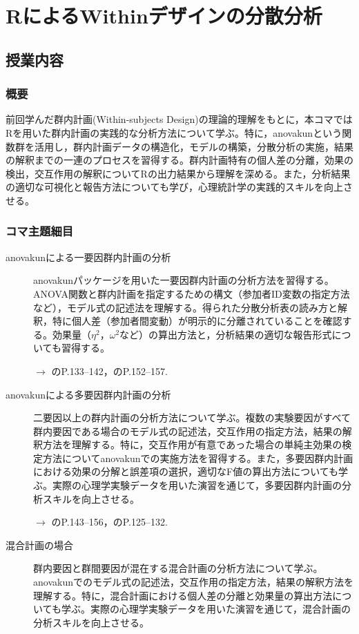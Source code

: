 \section{RによるWithinデザインの分散分析}
\label{b21_WithinDesign_onR}

\subsection{授業内容}
\subsubsection{概要}
前回学んだ群内計画(Within-subjects Design)の理論的理解をもとに，本コマではRを用いた群内計画の実践的な分析方法について学ぶ。特に，anovakunという関数群を活用し，群内計画データの構造化，モデルの構築，分散分析の実施，結果の解釈までの一連のプロセスを習得する。群内計画特有の個人差の分離，効果の検出，交互作用の解釈についてRの出力結果から理解を深める。また，分析結果の適切な可視化と報告方法についても学び，心理統計学の実践的スキルを向上させる。

\subsubsection{コマ主題細目}
\begin{description}

	\item[anovakunによる一要因群内計画の分析] anovakunパッケージを用いた一要因群内計画の分析方法を習得する。ANOVA関数と群内計画を指定するための構文（参加者ID変数の指定方法など），モデル式の記述法を理解する。得られた分散分析表の読み方と解釈，特に個人差（参加者間変動）が明示的に分離されていることを確認する。効果量（$\eta^2$，$\omega^2$など）の算出方法と，分析結果の適切な報告形式についても習得する。
	      \begin{flushright}
		      $\to$ \textcite{aoki2021}のP.133--142，\textcite{kosugi2019}のP.152--157.
	      \end{flushright}

	\item[anovakunによる多要因群内計画の分析] 二要因以上の群内計画の分析方法について学ぶ。複数の実験要因がすべて群内要因である場合のモデル式の記述法，交互作用の指定方法，結果の解釈方法を理解する。特に，交互作用が有意であった場合の単純主効果の検定方法についてanovakunでの実施方法を習得する。また，多要因群内計画における効果の分解と誤差項の選択，適切なF値の算出方法についても学ぶ。実際の心理学実験データを用いた演習を通じて，多要因群内計画の分析スキルを向上させる。
	      \begin{flushright}
		      $\to$ \textcite{aoki2021}のP.143--156，\textcite{kosugi2018}のP.125--132.
	      \end{flushright}

	\item[混合計画の場合] 群内要因と群間要因が混在する混合計画の分析方法について学ぶ。anovakunでのモデル式の記述法，交互作用の指定方法，結果の解釈方法を理解する。特に，混合計画における個人差の分離と効果量の算出方法についても学ぶ。実際の心理学実験データを用いた演習を通じて，混合計画の分析スキルを向上させる。

\end{description}
